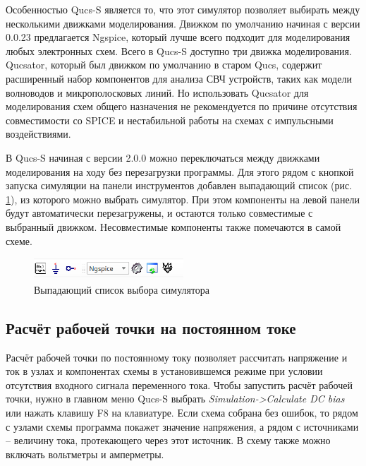 \documentclass[a4paper,12pt]{article}
\begin{document}
Особенностью Qucs-S является то, что этот симулятор позволяет выбирать между несколькими движками моделирования. Движком по умолчанию начиная с версии 0.0.23 предлагается Ngspice, который лучше всего подходит для моделирования любых электронных схем. Всего в Qucs-S доступно три движка моделирования. Qucsator, который был движком по умолчанию в старом Qucs, содержит расширенный набор компонентов для анализа СВЧ устройств, таких как модели волноводов и микрополосковых линий. Но использовать Qucsator для моделирования схем общего назначения не рекомендуется по причине отсутствия совместимости со SPICE и нестабильной работы на схемах с импульсными воздействиями. 

В Qucs-S начиная с версии 2.0.0 можно переключаться между движками моделирования на ходу без перезагрузки программы. Для этого рядом с кнопкой запуска симуляции на панели инструментов добавлен выпадающий список (рис. \ref{fig:sim_switch}), из которого можно выбрать симулятор. При этом компоненты на левой панели будут автоматически перезагружены, и остаются только совместимые с выбранный движком. Несовместимые компоненты также помечаются в самой схеме. 

    \begin{figure}[!ht]
    \begin{center}
        \includegraphics[width=0.5\textwidth]{img/sim_switch.png}
    \end{center}
    \caption{Выпадающий список выбора симулятора} \label{fig:sim_switch}
    \end{figure}

\subsection{Расчёт рабочей точки на постоянном токе}

Расчёт рабочей точки по постоянному току позволяет рассчитать напряжение и ток в узлах и компонентах схемы в установившемся режиме при условии отсутствия входного сигнала переменного тока. Чтобы запустить расчёт рабочей точки, нужно в главном меню Qucs-S выбрать \emph{Simulation->Calculate DC bias} или нажать клавишу F8 на клавиатуре. Если схема собрана без ошибок, то рядом с узлами схемы программа покажет значение напряжения, а рядом с источниками – величину тока, протекающего через этот источник. В схему также можно включать вольтметры и амперметры.
\end{document}
